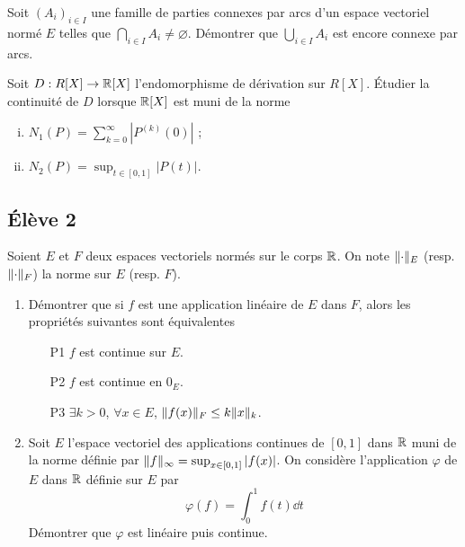\documentclass[10pt]{scrartcl}
\begin{document}
    \begin{exo}
        Soit $(A_i)_{i\in I}$ une famille de parties connexes par arcs d'un espace vectoriel normé $E$ telles que $\bigcap_{i\in I}A_i\neq \varnothing$. 
        Démontrer que $\bigcup_{i\in I} A_i$ est encore connexe par arcs.
    \end{exo}

    \begin{exo}
        Soit $D:R[X]\to\operatorname{\mathbb R}[X]$ l'endomorphisme de dérivation sur $R[X]$.
        Étudier la continuité de $D$ lorsque $\operatorname{\mathbb R}[X]$ est muni de la norme 
        \begin{enumerate}[(i)]
            \item $N_1(P)=\sum_{k=0}^\infty|P^{(k)}(0)|$ ;
            \item $N_2(P)=\sup_{t\in[0,1]}|P(t)|$.
        \end{enumerate}
    \end{exo}
 

    \subsection*{Élève 2}

    \begin{ccp}
        Soient $E$ et $F$ deux espaces vectoriels normés sur le corps $\operatorname{\mathbb R}$.
        On note $\lVert \cdot\rVert_E$ (resp. $\lVert \cdot\rVert_F$) la norme sur $E$ (resp. $F$).
        \begin{enumerate}
            \item Démontrer que si $f$ est une application linéaire de $E$ dans $F$, alors les propriétés suivantes sont équivalentes 
            \begin{itemize}
                \item[P1] $f$ est continue sur $E$.
                \item[P2] $f$ est continue en $0_E$.
                \item[P3] $\exists k>0$, $\forall x\in E$, $\lVert f(x)\rVert_F\leq k\lVert x\rVert_k$. 
            \end{itemize}
            \item Soit $E$ l'espace vectoriel des applications continues de $[0,1]$ dans $\operatorname{\mathbb R}$ muni de la norme définie par $\lVert f\rVert_\infty=\sup_{x\in[0,1]}|f(x)|$. 
            On considère l'application $\varphi$ de $E$ dans $\operatorname{\mathbb R}$ définie sur $E$ par
            \[
                \varphi(f)=\int_0^1f(t)\dd t
            \]
            Démontrer que $\varphi$ est linéaire puis continue.
        \end{enumerate}
    \end{ccp}
\end{document}
